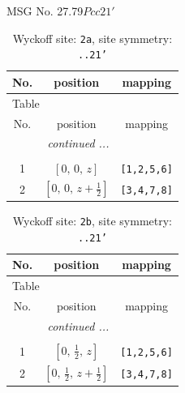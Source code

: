 \documentclass[fleqn,8pt]{jsarticle}
\begin{document}
\setcounter{MaxMatrixCols}{32}

\renewcommand{\tablename}{Table~}
\renewcommand{\figurename}{Figure~}
\begin{center}
\LARGE
MSG No. 27.79\quad$Pcc21'$
\end{center}
\renewcommand{\arraystretch}{1.2}
\begin{longtable}{ccc}
\caption{Wyckoff site: {\tt 2a}, site symmetry: {\tt ..21'}}
 \\
 \hline \hline
No. & position & mapping \\ \hline \endfirsthead

\multicolumn{2}{l}{\tablename\ \thetable{}} \\
 \hline \hline
No. & position & mapping \\ \hline \endhead

 \hline \hline
\multicolumn{2}{r}{\footnotesize\it continued ...} \\ \endfoot

 \hline \hline
\multicolumn{2}{r}{} \\ \endlastfoot

1 & $\left[ 0,\, 0,\, z \right]$ & {\tt [1,2,5,6]} \\ \hline
2 & $\left[ 0,\, 0,\, z + \frac{1}{2} \right]$ & {\tt [3,4,7,8]} \\
\end{longtable}
\renewcommand{\arraystretch}{1.2}
\begin{longtable}{ccc}
\caption{Wyckoff site: {\tt 2b}, site symmetry: {\tt ..21'}}
 \\
 \hline \hline
No. & position & mapping \\ \hline \endfirsthead

\multicolumn{2}{l}{\tablename\ \thetable{}} \\
 \hline \hline
No. & position & mapping \\ \hline \endhead

 \hline \hline
\multicolumn{2}{r}{\footnotesize\it continued ...} \\ \endfoot

 \hline \hline
\multicolumn{2}{r}{} \\ \endlastfoot

1 & $\left[ 0,\, \frac{1}{2},\, z \right]$ & {\tt [1,2,5,6]} \\ \hline
2 & $\left[ 0,\, \frac{1}{2},\, z + \frac{1}{2} \right]$ & {\tt [3,4,7,8]} \\
\end{longtable}
\renewcommand{\arraystretch}{1.2}
\end{document}
